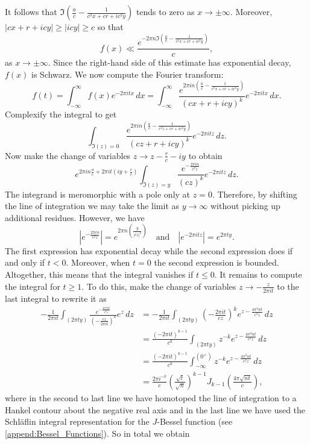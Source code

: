     It follows that $\Im\left(\frac{a}{c}-\frac{1}{c^{2}x+cr+ic^{2}y}\right)$ tends to zero as $x \to \pm\infty$. Moreover, $|cx+r+icy| \ge |icy| \ge c$ so that
    \[
      f(x) \ll \frac{e^{-2\pi n\Im\left(\frac{a}{c}-\frac{1}{c^{2}x+cr+ic^{2}y}\right)}}{c},
    \]
    as $x \to \pm\infty$. Since the right-hand side of this estimate has exponential decay, $f(x)$ is Schwarz. We now compute the Fourier transform:
    \[
      \hat{f}(t) = \int_{-\infty}^{\infty}f(x)e^{-2\pi itx}\,dx = \int_{-\infty}^{\infty}\frac{e^{2\pi in\left(\frac{a}{c}-\frac{1}{c^{2}x+cr+ic^{2}y}\right)}}{(cx+r+icy)^{k}}e^{-2\pi itx}\,dx.
    \]
    Complexify the integral to get
    \[
      \int_{\Im(z) = 0}\frac{e^{2\pi in\left(\frac{a}{c}-\frac{1}{c^{2}z+cr+ic^{2}y}\right)}}{(cz+r+icy)^{k}}e^{-2\pi itz}\,dz.
    \]
    Now make the change of variables $z \to z-\frac{r}{c}-iy$ to obtain
    \[
      e^{2\pi in\frac{a}{c}+2\pi it\left(iy+\frac{r}{c}\right)}\int_{\Im(z) = y}\frac{e^{-\frac{2\pi in}{c^{2}z}}}{(cz)^{k}}e^{-2\pi itz}\,dz.
    \]
    The integrand is meromorphic with a pole only at $z = 0$. Therefore, by shifting the line of integration we may take the limit as $y \to \infty$ without picking up additional residues. However, we have
    \[
      \left|e^{-\frac{2\pi in}{c^{2}z}}\right| = e^{2\pi n\left(\frac{y}{|cz|^{2}}\right)} \quad \text{and} \quad \left|e^{-2\pi itz}\right| = e^{2\pi ty}.
    \]
    The first expression has exponential decay while the second expression does if and only if $t < 0$. Moreover, when $t = 0$ the second expression is bounded. Altogether, this means that the integral vanishes if $t \le 0$. It remains to compute the integral for $t \ge 1$. To do this, make the change of variables $z \to - \frac{z}{2\pi it}$ to the last integral to rewrite it as
    \begin{align*}
      -\frac{1}{2\pi it}\int_{(2\pi ty)}\frac{e^{-\frac{4\pi^{2}nt}{c^{2}z}}}{\left(-\frac{cz}{2\pi it}\right)^{k}}e^{z}\,dz &= -\frac{1}{2\pi it}\int_{(2\pi ty)}\left(-\frac{2\pi it}{cz}\right)^{k}e^{z-\frac{4\pi^{2}nt}{c^{2}z}}\,dz \\
      &= \frac{(-2\pi it)^{k-1}}{c^{k}}\int_{(2\pi ty)}z^{-k}e^{z-\frac{4\pi^{2}nt}{c^{2}z}}\,dz \\
      &= \frac{(-2\pi it)^{k-1}}{c^{k}}\int_{-\infty}^{(0^{+})}z^{-k}e^{z-\frac{4\pi^{2}nt}{c^{2}z}}\,dz \\
      &= \frac{2\pi i^{-k}}{c}\left(\frac{\sqrt{t}}{\sqrt{n}}\right)^{k-1}J_{k-1}\left(\frac{4\pi\sqrt{nt}}{c}\right),
    \end{align*}
    where in the second to last line we have homotoped the line of integration to a Hankel contour about the negative real axis and in the last line we have used the Schl\"aflin integral representation for the $J$-Bessel function (see \cref{append:Bessel_Functions}). So in total we obtain
